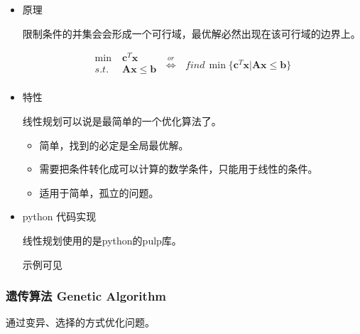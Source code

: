 \documentclass{article}
\begin{document}
\begin{itemize}

\item{原理}

限制条件的并集会会形成一个可行域，最优解必然出现在该可行域的边界上。

\begin{equation}
    \begin{split}
        \min &\; \mathbf{c}^T\mathbf{x} \\
        s.t. &\; \mathbf{Ax} \leqslant \mathbf{b} \\
    \end{split}
    \;\stackrel{or}{\Leftrightarrow}\;
    \begin{split}
        find\,\min \{\mathbf{c}^T\mathbf{x} | \mathbf{Ax} \leqslant \mathbf{b}\}
    \end{split}
\end{equation}

\item{特性}

线性规划可以说是最简单的一个优化算法了。

\begin{itemize}
    \item 简单，找到的必定是全局最优解。
    \item 需要把条件转化成可以计算的数学条件，只能用于线性的条件。
    \item 适用于简单，孤立的问题。
\end{itemize}

\item{python 代码实现}

线性规划使用的是python的pulp库。

示例可见

\end{itemize}

\subsubsection{遗传算法 Genetic Algorithm}

通过变异、选择的方式优化问题。
\end{document}
